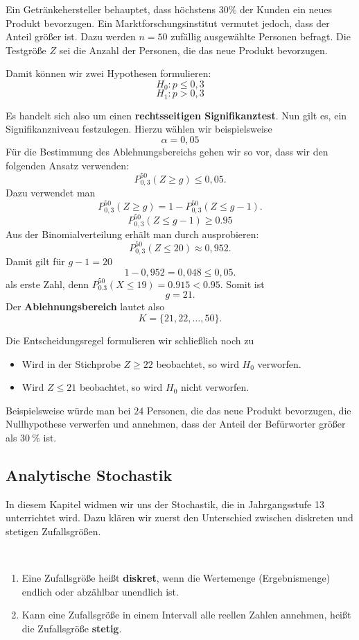 \documentclass[ngerman, 12pt]{nssheetxea}
\begin{document}
\begin{example}
Ein Getränkehersteller behauptet, dass höchstens $30\%$ der Kunden ein neues Produkt bevorzugen. 
Ein Marktforschungsinstitut vermutet jedoch, dass der Anteil größer ist. 
Dazu werden $n=50$ zufällig ausgewählte Personen befragt. 
Die Testgröße $Z$ sei die Anzahl der Personen, die das neue Produkt bevorzugen. \par
Damit können wir zwei Hypothesen formulieren:
\[
H_0: p \le 0{,}3
\]
\[
H_1: p > 0{,}3
\]

Es handelt sich also um einen \textbf{rechtsseitigen Signifikanztest}. Nun gilt es, ein Signifikanzniveau festzulegen. Hierzu wählen wir beispielsweise
\[
\alpha = 0{,}05
\]
Für die Bestimmung des Ablehnungsbereichs gehen wir so vor, dass wir den folgenden Ansatz verwenden:
\[
P_{0,3}^{50}(Z \ge g) \le 0{,}05.
\]
Dazu verwendet man
\[
P_{0,3}^{50}(Z \ge g)=1-P_{0,3}^{50}(Z \le g-1).
\]
\[  P_{0,3}^{50}(Z \le g-1) \geq \num{0,95} \]
Aus der Binomialverteilung erhält man durch ausprobieren:
\[
P_{0,3}^{50}(Z \le 20) \approx 0{,}952.
\]
Damit gilt für $g-1=20$
\[
1-0{,}952=0{,}048 \le 0{,}05.
\]
als erste Zahl, denn $P_{\num{0,3}}^{50} (X\leq 19) = \num{0,915} < \num{0,95}$. Somit ist
\[
g=21.
\]
Der \textbf{Ablehnungsbereich} lautet also
\[
K=\{21,22,\ldots,50\}.
\]

Die Entscheidungsregel formulieren wir schließlich noch zu
\begin{itemize}
\item Wird in der Stichprobe $Z \ge 22$ beobachtet, so wird $H_0$ verworfen.
\item Wird $Z \le 21$ beobachtet, so wird $H_0$ nicht verworfen.
\end{itemize}
Beispielsweise würde man bei $24$ Personen, die das neue Produkt bevorzugen, die Nullhypothese verwerfen und annehmen, dass der Anteil der Befürworter größer als $\SI{30}{\percent}$ ist.
\end{example}



\newpage
\subsection{Analytische Stochastik}
\label{ssec:AnalytischeStochastik}

In diesem Kapitel widmen wir uns der Stochastik, die in Jahrgangsstufe 13 unterrichtet wird. Dazu klären wir zuerst den Unterschied zwischen diskreten und stetigen Zufallsgrößen.

\begin{definition} \
\begin{enumerate}
\item Eine Zufallsgröße heißt \textbf{diskret}, wenn die Wertemenge (Ergebnismenge) endlich oder abzählbar unendlich ist.
\item Kann eine Zufallsgröße in einem Intervall alle reellen Zahlen annehmen, heißt die Zufallsgröße \textbf{stetig}.
\end{enumerate}
\end{definition}
\end{document}
